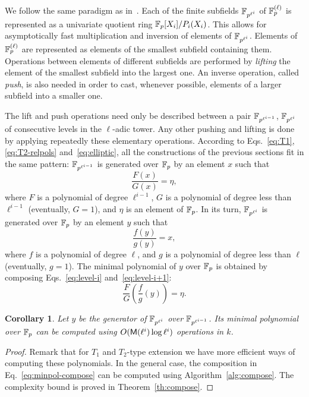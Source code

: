 \documentclass{sig-alternate}
\newtheorem{corollary}[theorem]{Corollary}
\begin{document}
We follow the same paradigm as in~\cite{df+schost12}. Each of the
finite subfields $\mathbb{F}_{p^{\ell^i}}$ of $\mathbb{F}_p^{(\ell)}$ is represented
as a univariate quotient ring $\mathbb{F}_p[X_i]/P_i(X_i)$. This allows for
asymptotically fast multiplication and inversion of elements of
$\mathbb{F}_{p^{\ell^i}}$. Elements of $\mathbb{F}_p^{(\ell)}$ are represented as
elements of the smallest subfield containing them. Operations between
elements of different subfields are performed by \emph{lifting} the
element of the smallest subfield into the largest one. An inverse
operation, called \emph{push}, is also needed in order to cast,
whenever possible, elements of a larger subfield into a smaller one.

The lift and push operations need only be described between a pair
$\mathbb{F}_{p^{\ell^{i-1}}}$, $\mathbb{F}_{p^{\ell^i}}$ of consecutive levels in the
$\ell$-adic tower. Any other pushing and lifting is done by applying
repeatedly these elementary operations. According to
Eqs.~\eqref{eq:T1}, \eqref{eq:T2-relpols} and~\eqref{eq:elliptic}, all
the constructions of the previous sections fit in the same pattern:
$\mathbb{F}_{p^{\ell^{i-1}}}$ is generated over $\mathbb{F}_p$ by an element $x$ such
that
\begin{equation}
  \label{eq:level-i}
  \frac{F(x)}{G(x)} = \eta,
\end{equation}
where $F$ is a polynomial of degree $\ell^{i-1}$, $G$ is a polynomial
of degree less than $\ell^{i-1}$ (eventually, $G=1$), and $\eta$ is an
element of $\mathbb{F}_p$. In its turn, $\mathbb{F}_{p^{\ell^i}}$ is generated over
$\mathbb{F}_p$ by an element $y$ such that
\begin{equation}
  \label{eq:level-i+1}
  \frac{f(y)}{g(y)} = x,
\end{equation}
where $f$ is a polynomial of degree $\ell$, and $g$ is a
polynomial of degree less than $\ell$ (eventually, $g=1$). The
minimal polynomial of $y$ over $\mathbb{F}_p$ is obtained by composing
Eqs.~\eqref{eq:level-i} and~\eqref{eq:level-i+1}:
\begin{equation}
  \label{eq:minpol-compose}
  \frac{F}{G}\left(\frac{f}{g}(y)\right) = \eta.
\end{equation}

\begin{corollary}
  \sloppy
  Let $y$ be the generator of $\mathbb{F}_{p^{\ell^i}}$ over
  $\mathbb{F}_{p^{\ell^{i-1}}}$. Its minimal polynomial over $\mathbb{F}_p$ can be
  computed using $O(\mathsf{M}(\ell^i)\log\ell^i)$ operations in $k$.
\end{corollary}
\begin{proof}
  Remark that for $T_1$ and $T_2$-type extension we have more
  efficient ways of computing these polynomials. In the general case,
  the composition in Eq.~\eqref{eq:minpol-compose} can be computed
  using Algorithm~\ref{alg:compose}. The complexity bound is proved in
  Theorem~\ref{th:compose}.
\end{proof}
\end{document}
